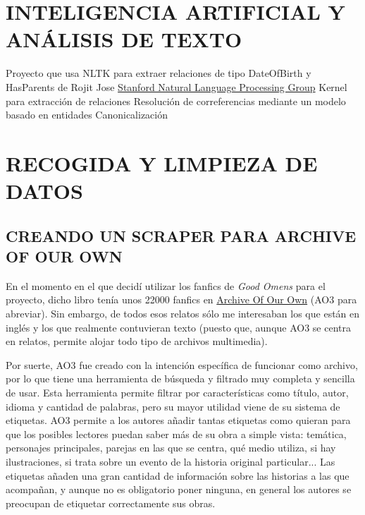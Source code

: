 \documentclass{pre-tfg}
\begin{document}
\section{INTELIGENCIA ARTIFICIAL Y ANÁLISIS DE TEXTO}
Proyecto que usa NLTK para extraer relaciones de tipo DateOfBirth y HasParents de Rojit Jose \cite{jose_2017} 
\href{https://nlp.stanford.edu}{Stanford Natural Language Processing Group}
Kernel para extracción de relaciones \cite{zelenko_2003} 
Resolución de correferencias mediante un modelo basado en entidades \cite{wick_2009}
Canonicalización \cite{culotta_2007}





\section{RECOGIDA Y LIMPIEZA DE DATOS}

\subsection{CREANDO UN SCRAPER PARA ARCHIVE OF OUR OWN}
\label{sec:recogidadatos}

En el momento en el que decidí utilizar los fanfics de \textit{Good Omens} para el proyecto, dicho libro tenía unos 22000 fanfics en \href{archiveofourown.org}{Archive Of Our Own} (AO3 para abreviar). Sin embargo, de todos esos relatos sólo me interesaban los que están en inglés y los que realmente contuvieran texto (puesto que, aunque AO3 se centra en relatos, permite alojar todo tipo de archivos multimedia).

Por suerte, AO3 fue creado con la intención específica de funcionar como archivo, por lo que tiene una herramienta de búsqueda y filtrado muy completa y sencilla de usar. Esta herramienta permite filtrar por características como título, autor, idioma y cantidad de palabras, pero su mayor utilidad viene de su sistema de etiquetas. AO3 permite a los autores añadir tantas etiquetas como quieran para que los posibles lectores puedan saber más de su obra a simple vista: temática, personajes principales, parejas en las que se centra, qué medio utiliza, si hay ilustraciones, si trata sobre un evento de la historia original particular... Las etiquetas añaden una gran cantidad de información sobre las historias a las que acompañan, y aunque no es obligatorio poner ninguna, en general los autores se preocupan de etiquetar correctamente sus obras.
\end{document}
